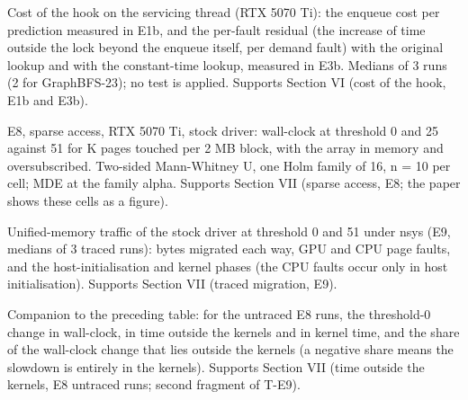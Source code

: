 \documentclass[journal]{IEEEtran}
\begin{document}
\begin{table}[t]
\centering\footnotesize
\caption{Cost of the hook on the servicing thread (RTX 5070 Ti): the enqueue cost per prediction measured in E1b, and the per-\allowbreak{}fault residual (the increase of time outside the lock beyond the enqueue itself, per demand fault) with the original lookup and with the constant-\allowbreak{}time lookup, measured in E3b. Medians of 3 runs (2 for GraphBFS-\allowbreak{}23); no test is applied. Supports Section VI (cost of the hook, E1b and E3b).}
\label{tab:s-t_hand}
\end{table}

\begin{table}[t]
\centering\footnotesize
\caption{E8, sparse access, RTX 5070 Ti, stock driver: wall-\allowbreak{}clock at threshold 0 and 25 against 51 for K pages touched per 2 MB block, with the array in memory and oversubscribed. Two-\allowbreak{}sided Mann-\allowbreak{}Whitney U, one Holm family of 16, n =\allowbreak{} 10 per cell; MDE at the family alpha. Supports Section VII (sparse access, E8; the paper shows these cells as a figure).}
\label{tab:s-t_e8}
\end{table}

\begin{table}[t]
\centering\footnotesize
\caption{Unified-\allowbreak{}memory traffic of the stock driver at threshold 0 and 51 under nsys (E9, medians of 3 traced runs): bytes migrated each way, GPU and CPU page faults, and the host-\allowbreak{}initialisation and kernel phases (the CPU faults occur only in host initialisation). Supports Section VII (traced migration, E9).}
\label{tab:s-t_e9}
\end{table}

\begin{table}[t]
\centering\footnotesize
\caption{Companion to the preceding table: for the untraced E8 runs, the threshold-\allowbreak{}0 change in wall-\allowbreak{}clock, in time outside the kernels and in kernel time, and the share of the wall-\allowbreak{}clock change that lies outside the kernels (a negative share means the slowdown is entirely in the kernels). Supports Section VII (time outside the kernels, E8 untraced runs; second fragment of T-\allowbreak{}E9).}
\label{tab:s-t_e9b}
\end{table}
\end{document}

